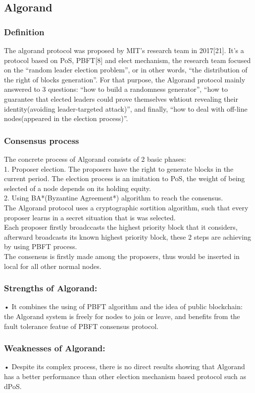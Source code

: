\documentclass[]{article}
\begin{document}
\begin{CJK*}{UTF8}{gbsn}
	\subsection{Algorand}
	\subsubsection*{Definition}  
	The algorand protocol was proposed by MIT's research team in 2017[21]. It's a protocol based on PoS, PBFT[8] and elect mechanism, the research team focused on the ``random leader election problem'', or in other words, ``the distribution of the right of blocks generation''. For that purpose, the Algorand protocol mainly answered to 3 questions: ``how to build a randomness generator'', ``how to guarantee that elected leaders could prove themselves whtiout revealing their identity(avoiding leader-targeted attack)'', and finally, ``how to deal with off-line nodes(appeared in the election process)''.
	\subsubsection*{Consensus process}
	The concrete process of Algorand consists of 2 basic phases: 
	\\1. Proposer election. The proposers have the right to generate blocks in the current period. The election process is an imitation to PoS, the weight of being selected of a node depends on its holding equity.
	\\2. Using BA*(Byzantine Agreement*) algorithm to reach the consensus.
	\\The Algorand protocol uses a  cryptographic sortition algorithm, such that every proposer learns in a secret situation that is was selected.	
	\\Each proposer firstly broadccasts the highest priority block that it considers, afterward broadcasts its known highest priority block, these 2 steps are achieving by using PBFT process.
	\\The consensus is firstly made among the proposers, thus would be inserted in local for all other normal nodes. 
\subsubsection*{Strengths of Algorand:}	
• It combines the using of PBFT algorithm and the idea of public blockchain: the Algorand system is freely for nodes to join or leave, and benefits from the fault tolerance featue of PBFT consensus protocol.
\subsubsection*{Weaknesses of Algorand:}
• Despite its complex process, there is no direct results showing that Algorand has a better performance than other election mechanism based protocol such as dPoS.


\end{CJK*}
\end{document}
